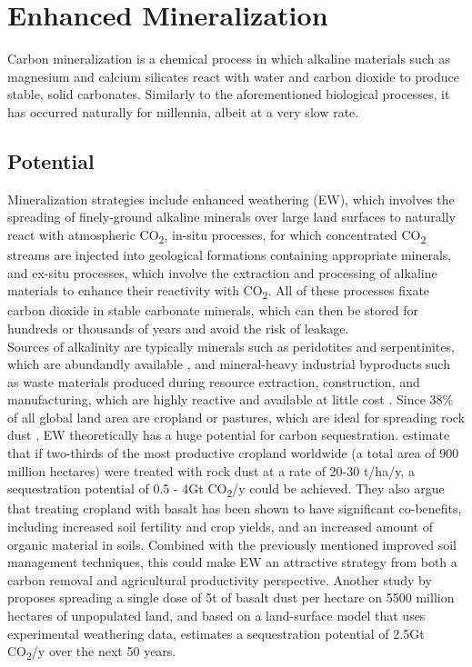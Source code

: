 \section{Enhanced Mineralization}
Carbon mineralization is a chemical process in which alkaline materials such as magnesium and calcium silicates react with water and carbon dioxide to produce stable, solid carbonates. Similarly to the aforementioned biological processes, it has occurred naturally for millennia, albeit at a very slow rate.
\subsection*{Potential}
Mineralization strategies include enhanced weathering (EW), which involves the spreading of finely-ground alkaline minerals over large land surfaces to naturally react with atmospheric CO\textsubscript{2}, in-situ processes, for which concentrated CO\textsubscript{2} streams are injected into geological formations containing appropriate minerals, and ex-situ processes, which involve the extraction and processing of alkaline materials to enhance their reactivity with CO\textsubscript{2}. All of these processes fixate carbon dioxide in stable carbonate minerals, which can then be stored for hundreds or thousands of years and avoid the risk of leakage. \\
Sources of alkalinity are typically minerals such as peridotites and serpentinites, which are abundandly available \parencite{Lackner1997ProgressSubstrates}, and mineral-heavy industrial byproducts such as waste materials produced during resource extraction, construction, and manufacturing, which are highly reactive and available at little cost \parencite{NationalResearchCouncil2015ClimateSequestration}.
Since 38\% of all global land area are cropland or pastures, which are ideal for spreading rock dust \parencite{Almaraz2022MethodsSettings}, EW theoretically has a huge potential for carbon sequestration. \textcite{Beerling2018FarmingSecurity} estimate that if two-thirds of the most productive cropland worldwide (a total area of 900 million hectares) were treated with rock dust at a rate of 20-30 t/ha/y, a sequestration potential of 0.5 - 4Gt CO\textsubscript{2}/y could be achieved. They also argue that treating cropland with basalt has been shown to have significant co-benefits, including increased soil fertility and crop yields, and an increased amount of organic material in soils. Combined with the previously mentioned improved soil management techniques, this could make EW an attractive strategy from both a carbon removal and agricultural productivity perspective. Another study by \textcite{Goll2021PotentialRock} proposes spreading a single dose of 5t of basalt dust per hectare on 5500 million hectares of unpopulated land, and based on a land-surface model that uses experimental weathering data, estimates a sequestration potential of 2.5Gt CO\textsubscript{2}/y over the next 50 years.\\
